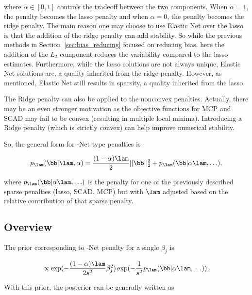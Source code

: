 \noindent where $\alpha \in [0, 1]$ controls the tradeoff between the two components. When $\alpha = 1$, the penalty becomes the lasso penalty and when $\alpha = 0$, the penalty becomes the ridge penalty. The main reason one may choose to use Elastic Net over the lasso is that the addition of the ridge penalty can add stability. So while the previous methods in Section~\ref{sec:bias_reducing} focused on reducing bias, here the addition of the $L_2$ component reduces the variability compared to the lasso estimates. Furthermore, while the lasso solutions are not always unique, Elastic Net solutions are, a quality inherited from the ridge penalty. However, as mentioned, Elastic Net still results in sparsity, a quality inherited from the lasso.

The Ridge penalty can also be applied to the nonconvex penalties. Actually, there may be an even stronger motivation as the objective functions for MCP and SCAD may fail to be convex (resulting in multiple local minima). Introducing a Ridge penalty (which is strictly convex) can help improve numerical stability.

So, the general form for -Net type penalties is

$$
p_\lam(\bb | \lam, \alpha) = \frac{(1 - \alpha) \lam }{2} ||\bb||^2_2 + p_{\lam}(\bb | \alpha\lam, \ldots),
$$

\noindent where $p_{\lam}(\bb | \alpha\lam, \ldots)$ is the penalty for one of the previously described sparse penalties (lasso, SCAD, MCP) but with $\lam$ adjusted based on the relative contribution of that sparse penalty. 

\subsection{Overview}

The prior corresponding to -Net penalty for a single $\beta_j$ is

$$
\propto \exp(-\frac{(1-\alpha) \lam}{2s^2}\beta_j^2)\exp(-\frac{1}{s^2} p_{\lam}(\bb | \alpha\lam, \ldots)),
$$

\noindent With this prior, the posterior can be generally written as


